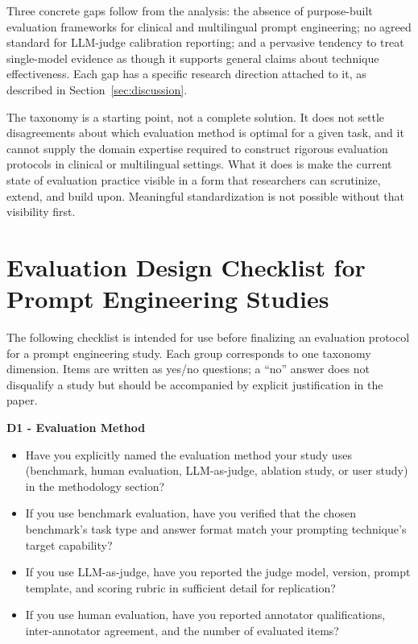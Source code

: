 \documentclass[journal]{IEEEtran}
\begin{document}
Three concrete gaps follow from the analysis: the absence of
purpose-built evaluation frameworks for clinical and multilingual
prompt engineering; no agreed standard for LLM-judge calibration
reporting; and a pervasive tendency to treat single-model evidence
as though it supports general claims about technique effectiveness.
Each gap has a specific research direction attached to it, as described
in Section~\ref{sec:discussion}.

The taxonomy is a starting point, not a complete solution. It does
not settle disagreements about which evaluation method is optimal
for a given task, and it cannot supply the domain expertise required
to construct rigorous evaluation protocols in clinical or multilingual
settings. What it does is make the current state of evaluation
practice visible in a form that researchers can scrutinize, extend,
and build upon. Meaningful standardization is not possible without
that visibility first.





\appendix
\section{Evaluation Design Checklist for Prompt Engineering Studies}
\label{app:checklist}

The following checklist is intended for use before finalizing an evaluation
protocol for a prompt engineering study. Each group corresponds to one
taxonomy dimension. Items are written as yes/no questions; a ``no'' answer
does not disqualify a study but should be accompanied by explicit
justification in the paper.

\textbf{D1 - Evaluation Method}
\begin{itemize}
  \item Have you explicitly named the evaluation method your study uses
        (benchmark, human evaluation, LLM-as-judge, ablation study, or
        user study) in the methodology section?
  \item If you use benchmark evaluation, have you verified that the chosen
        benchmark's task type and answer format match your prompting
        technique's target capability?
  \item If you use LLM-as-judge, have you reported the judge model,
        version, prompt template, and scoring rubric in sufficient detail
        for replication?
  \item If you use human evaluation, have you reported annotator
        qualifications, inter-annotator agreement, and the number of
        evaluated items?
\end{itemize}
\end{document}
